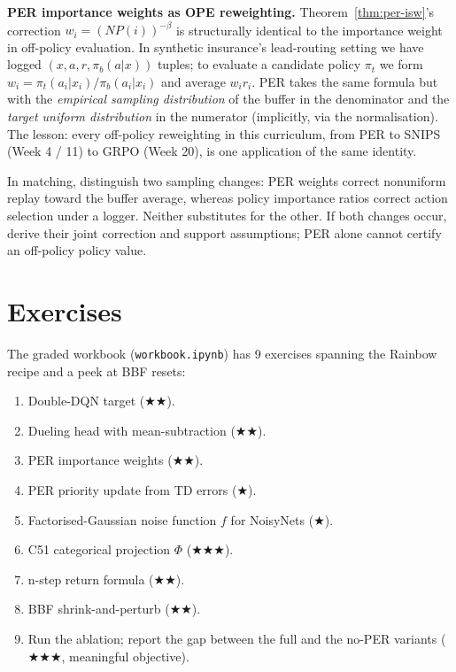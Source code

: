 \documentclass[11pt,oneside]{scrbook}
\begin{document}
\begin{matching}
\textbf{PER importance weights as OPE reweighting.}
Theorem~\ref{thm:per-isw}'s correction $w_i = (NP(i))^{-\beta}$ is structurally identical
to the importance weight in off-policy evaluation. In synthetic insurance's lead-routing setting we
have logged $(x, a, r, \pi_b(a|x))$ tuples; to evaluate a candidate policy $\pi_t$ we
form $w_i = \pi_t(a_i|x_i) / \pi_b(a_i|x_i)$ and average $w_i r_i$. PER takes the same
formula but with the \emph{empirical sampling distribution} of the buffer in the
denominator and the \emph{target uniform distribution} in the numerator (implicitly,
via the normalisation). The lesson: every off-policy reweighting in this curriculum, from
PER to SNIPS (Week 4 / 11) to GRPO (Week 20), is one application of the same identity.

In matching, distinguish two sampling changes: PER weights correct
nonuniform replay toward the buffer average, whereas policy importance
ratios correct action selection under a logger. Neither substitutes for
the other. If both changes occur, derive their joint correction and
support assumptions; PER alone cannot certify an off-policy policy value.

\end{matching}

\chapter{Exercises}

The graded workbook (\texttt{workbook.ipynb}) has 9 exercises spanning the Rainbow recipe
and a peek at BBF resets:

\begin{enumerate}
  \item Double-DQN target ($\bigstar\bigstar$).
  \item Dueling head with mean-subtraction ($\bigstar\bigstar$).
  \item PER importance weights ($\bigstar\bigstar$).
  \item PER priority update from TD errors ($\bigstar$).
  \item Factorised-Gaussian noise function $f$ for NoisyNets ($\bigstar$).
  \item C51 categorical projection $\Phi$ ($\bigstar\bigstar\bigstar$).
  \item n-step return formula ($\bigstar\bigstar$).
  \item BBF shrink-and-perturb ($\bigstar\bigstar$).
  \item Run the ablation; report the gap between the full and the no-PER variants ($\bigstar\bigstar\bigstar$, meaningful objective).
\end{enumerate}
\end{document}
